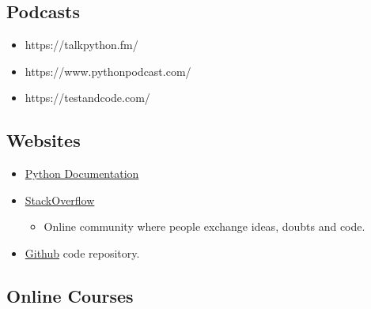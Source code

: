\documentclass[11pt]{article}
\providecommand{\tightlist}{%
      \setlength{\itemsep}{0pt}\setlength{\parskip}{0pt}}
\begin{document}
    \hypertarget{podcasts}{%
\subsection{Podcasts}\label{podcasts}}

\begin{itemize}
\tightlist
\item
  https://talkpython.fm/
\item
  https://www.pythonpodcast.com/
\item
  https://testandcode.com/
\end{itemize}

    \hypertarget{websites}{%
\subsection{Websites}\label{websites}}

\begin{itemize}
\tightlist
\item
  \href{https://docs.python.org/3/}{Python Documentation}
\item
  \href{https://stackoverflow.com/questions/tagged/python}{StackOverflow}

  \begin{itemize}
  \tightlist
  \item
    Online community where people exchange ideas, doubts and code.
  \end{itemize}
\item
  \href{https://github.com/python}{Github} code repository.
\end{itemize}

    \hypertarget{online-courses}{%
\subsection{Online Courses}\label{online-courses}}
\end{document}
